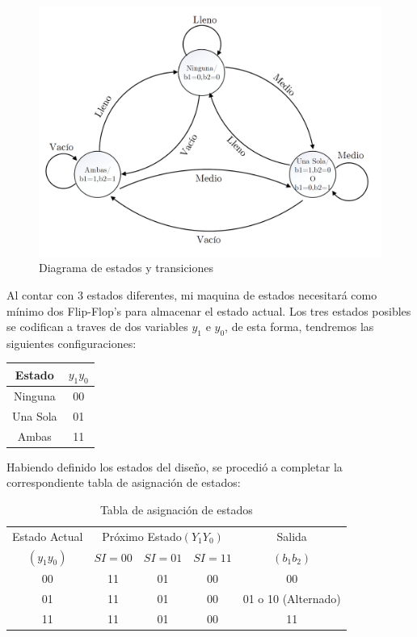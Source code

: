 \documentclass[10pt,a4paper]{article}
\begin{document}
\begin{figure}[H]
\centering
\includegraphics[scale=0.4]{images/diagrama_estados_moore.png}
\caption{Diagrama de estados y transiciones} \label{1_figa}
\end{figure}

Al contar con 3 estados diferentes, mi maquina de estados necesitará como mínimo dos Flip-Flop's para almacenar el estado actual. Los tres estados posibles se codifican a traves de dos variables $y_1$ e $y_0$, de esta forma, tendremos las siguientes configuraciones:

\bigskip

\begin{table}[ht]
	\centering
	\begin{tabular}{c|c}
	Estado & $y_1y_0$ \\ 
	\hline 
	Ninguna & 00 \\ 
	Una Sola & 01 \\ 
	Ambas & 11 \\ 
	\end{tabular} 
\end{table}


Habiendo definido los estados del diseño, se procedió a completar la correspondiente tabla de asignación de estados:
\bigskip
\begin{table}[ht]
	\centering
	\begin{tabular}{c|c|c|c|c}
	Estado Actual & \multicolumn{3}{c|}{Próximo Estado$(Y_1Y_0)$} & Salida\\
	\cline{2-4}
	$(y_1y_0)$ & $SI=00$ & $SI=01$ & $SI=11$ & $(b_1b_2)$\\
	\hline
	00 & 11 & 01 & 00 & 00 \\
	01 & 11 & 01 & 00 & 01 o 10 (Alternado) \\
	11 & 11 & 01 & 00 & 11 \\
	\end{tabular}
	\caption{Tabla de asignación de estados}
	\label{1_t1}
\end{table}
\end{document}

